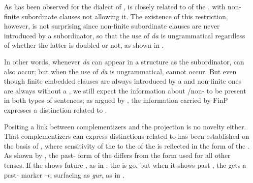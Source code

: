 \documentclass[output=paper,colorlinks,citecolor=brown]{langsci/langscibook}
\begin{document}
As has been observed for the  dialect of  \citep{dagnac2012},   is closely related to  of the , with non-finite subordinate clauses not allowing it. The existence of this restriction, however, is not surprising since  non-finite subordinate clauses are never introduced by a subordinator, so that the use of \textit{da} is ungrammatical regardless of whether the latter is doubled or not, as shown in .

\begin{exe}
\end{exe}

\noindent In other words, whenever \textit{da} can appear in a structure as the subordinator,  can also occur; but when the use of \textit{da} is ungrammatical,  cannot occur. But even though  finite embedded clauses are always introduced by a  and non-finite ones are always without a , we still expect the information about /non- to be present in both types of sentences; as argued by \cite{rizzi1997}, the information carried by FinP expresses a distinction related to .

Positing a link between complementizers and the  projection is no novelty either. That complementizers can express distinctions related to  has been established on the basis of , where sensitivity of the  to the  of the  is reflected in the form of the  \citep{Koppen2017}. As shown by , the past- form of the  differs from the form used for all other tenses. If the  shows future , as in , the  is go, but when it shows past , the  gets a past- marker \textit{-r}, surfacing as \textit{gur}, as in .
\end{document}
